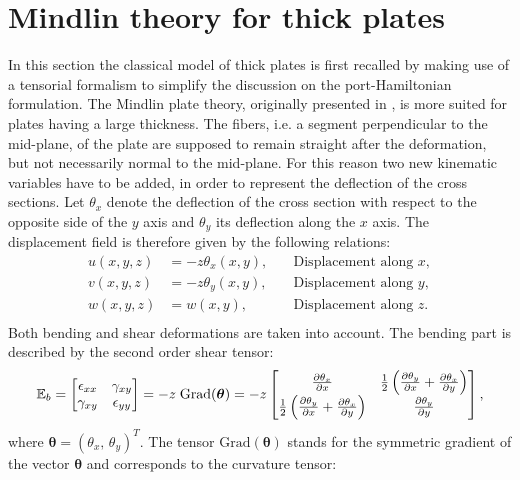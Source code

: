 \documentclass[11pt]{article}
\begin{document}
	\section{Mindlin theory for thick plates}
	\label{sec:Min_Var}
	{In this section the classical model of thick plates is first recalled by making use of a tensorial formalism to simplify the discussion on the port-Hamiltonian formulation.} The Mindlin plate theory, originally presented in \cite{mindlin}, is more suited for plates having a large thickness. The fibers, i.e. a segment perpendicular to the mid-plane, of the plate are supposed to remain straight after the deformation, but not necessarily normal to the mid-plane. For this reason two new kinematic variables have to be added, in order to represent the deflection of the cross sections. { Let $\theta_x$ denote the deflection of the cross section with respect to the opposite side of the $y$ axis and  $\theta_y$ its deflection along the $x$ axis. The displacement field is therefore given by the following relations:
		\begin{equation}
		\begin{aligned}
		u(x,y,z) &= -z \theta_x(x,y), \quad &\text{Displacement along $x$}, \\
		v(x,y,z) &= -z \theta_y(x,y), \quad &\text{Displacement along $y$}, \\
		w(x,y,z) &= w(x,y),  \quad &\text{Displacement along $z$}. \\
		\end{aligned}
		\end{equation}
		Both bending and shear deformations are taken into account. The bending part is described by the second order shear tensor:
		\begin{equation}
		\mathbb{E}_b = 
		\begin{bmatrix}
		\epsilon_{xx} & \gamma_{xy} \\
		\gamma_{xy} & \epsilon_{yy} \\
		\end{bmatrix} = -z \; \mathrm{Grad}(\bm\theta) = -z
		\begin{bmatrix}
		\diffp{\theta_x}{x} & \frac{1}{2} \left( \diffp{\theta_y}{x} + \diffp{\theta_x}{y} \right)\\
		\frac{1}{2} \left( \diffp{\theta_y}{x} + \diffp{\theta_x}{y} \right) & \diffp{\theta_y}{y} \\
		\end{bmatrix},
		\end{equation}
		where $\bm{\theta} = (\theta_x, \, \theta_y)^T$. The tensor $\mathrm{Grad}(\bm{\theta})$ stands for the symmetric gradient of the vector $\bm{\theta}$ and corresponds to the curvature tensor:
}
\end{document}
